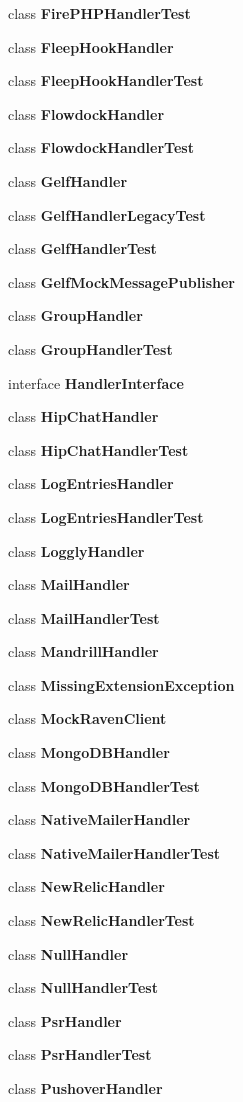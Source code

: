 \begin{DoxyCompactItemize}
class {\bf Fire\+P\+H\+P\+Handler\+Test}
\item 
class {\bf Fleep\+Hook\+Handler}
\item 
class {\bf Fleep\+Hook\+Handler\+Test}
\item 
class {\bf Flowdock\+Handler}
\item 
class {\bf Flowdock\+Handler\+Test}
\item 
class {\bf Gelf\+Handler}
\item 
class {\bf Gelf\+Handler\+Legacy\+Test}
\item 
class {\bf Gelf\+Handler\+Test}
\item 
class {\bf Gelf\+Mock\+Message\+Publisher}
\item 
class {\bf Group\+Handler}
\item 
class {\bf Group\+Handler\+Test}
\item 
interface {\bf Handler\+Interface}
\item 
class {\bf Hip\+Chat\+Handler}
\item 
class {\bf Hip\+Chat\+Handler\+Test}
\item 
class {\bf Log\+Entries\+Handler}
\item 
class {\bf Log\+Entries\+Handler\+Test}
\item 
class {\bf Loggly\+Handler}
\item 
class {\bf Mail\+Handler}
\item 
class {\bf Mail\+Handler\+Test}
\item 
class {\bf Mandrill\+Handler}
\item 
class {\bf Missing\+Extension\+Exception}
\item 
class {\bf Mock\+Raven\+Client}
\item 
class {\bf Mongo\+D\+B\+Handler}
\item 
class {\bf Mongo\+D\+B\+Handler\+Test}
\item 
class {\bf Native\+Mailer\+Handler}
\item 
class {\bf Native\+Mailer\+Handler\+Test}
\item 
class {\bf New\+Relic\+Handler}
\item 
class {\bf New\+Relic\+Handler\+Test}
\item 
class {\bf Null\+Handler}
\item 
class {\bf Null\+Handler\+Test}
\item 
class {\bf Psr\+Handler}
\item 
class {\bf Psr\+Handler\+Test}
\item 
class {\bf Pushover\+Handler}

\end{DoxyCompactItemize}
